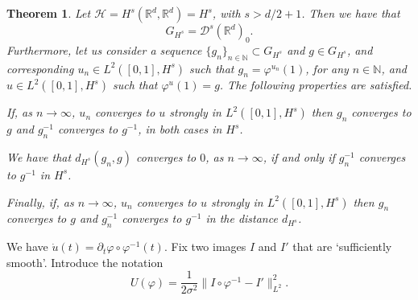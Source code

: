 \documentclass{article}
\theoremstyle{plain}
\newtheorem{teo}{Theorem}[section]
\theoremstyle{definition}
\numberwithin{equation}{section}
\begin{document}
\begin{teo}\label{Hscase}
	Let $\mathcal{H}=H^s(\mathbb{R}^d,\mathbb{R}^d)=H^s$, with $s>d/2+1$. Then
	we have that
	\begin{equation}\label{equivalence}
	G_{H^s}=\mathcal{D}^s(\mathbb{R}^d)_0.
	\end{equation}
	Furthermore, let us consider a sequence $\{ g_n\}_{n\in\mathbb{N}}\subset G_{H^s}$ and $ g\in G_{H^s}$, and corresponding $u_n\in L^2([0,1],H^s)$ such that
	$ g_n=\varphi^{u_n}(1)$, for any $n\in\mathbb{N}$, and $u\in L^2([0,1],H^s)$  such that $\varphi^u(1)= g$. The following properties are satisfied. 
	
	If, as $n\to\infty$, $u_n$ converges to $u$ strongly in $L^2([0,1],H^s)$ then
	$ g_n$ converges to $ g$ and $ g_n^{-1}$ converges to $ g^{-1}$, in both cases in $H^s$.
	
	We have that $d_{H^s}( g_n, g)$ converges to $0$, as $n\to\infty$, if and only if
	$ g_n^{-1}$ converges to $ g^{-1}$ in $H^s$.
	
	Finally, if, as $n\to\infty$, $u_n$ converges to $u$ strongly in $L^2([0,1],H^s)$ then
	$ g_n$ converges to $ g$ and $ g_n^{-1}$ converges to $ g^{-1}$ in the distance $d_{H^s}$.
\end{teo}

We have $\dot{u}(t)=\partial_t\varphi \circ \varphi^{-1}(t)$. Fix two images $I$ and $I'$ that are `sufficiently smooth'. Introduce the notation
\[
U(\varphi)= \frac{1}{2\sigma^2}\|I\circ \varphi^{-1}-I'\|^2_{L^2}.
\]
\end{document}
